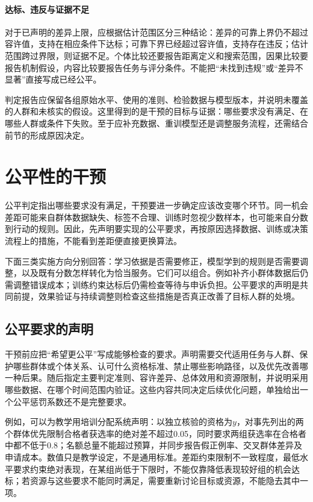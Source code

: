 \paragraph{达标、违反与证据不足}

对于已声明的差异上限，应根据估计范围区分三种结论：差异的可靠上界仍不超过容许值，支持在相应条件下达标；可靠下界已经超过容许值，支持存在违反；估计范围跨过界限，则证据不足。个体比较还要报告距离定义和搜索范围，因果比较要报告机制假设，内容比较要报告任务与评分条件。不能把“未找到违规”或“差异不显著”直接写成已经公平。

判定报告应保留各组原始水平、使用的准则、检验数据与模型版本，并说明未覆盖的人群和未核实的假设。这里得到的是干预的目标与证据：哪些要求没有满足、在哪些人群或条件下失败。至于应补充数据、重训模型还是调整服务流程，还需结合前节的形成原因决定。

\section{公平性的干预}
\label{sec:fairness-intervention}

公平判定指出哪些要求没有满足，干预要进一步确定应该改变哪个环节。同一机会差距可能来自群体数据缺失、标签不合理、训练时忽视少数样本，也可能来自分数到行动的规则。因此，先声明要实现的公平要求，再按原因选择数据、训练或决策流程上的措施，不能看到差距便直接更换算法。

下面三类实施方向分别回答：学习依据是否需要修正，模型学到的规则是否需要调整，以及既有分数怎样转化为恰当服务。它们可以组合。例如补齐小群体数据后仍需调整错误成本；训练约束达标后仍需检查等待与申诉负担。公平要求的声明是共同前提，效果验证与持续调整则检查这些措施是否真正改善了目标人群的处境。

\subsection{公平要求的声明}
\label{sec:fairness-requirements}

干预前应把“希望更公平”写成能够检查的要求。声明需要交代适用任务与人群、保护哪些群体或个体关系、认可什么资格标准、禁止哪些影响路径，以及优先改善哪一种后果。随后指定主要判定准则、容许差异、总体效用和资源限制，并说明采用哪些数据、在哪个时间范围内验证。这些内容共同决定后续优化问题，单独给出一个公平惩罚系数还不是完整要求。

例如，可以为教学用培训分配系统声明：以独立核验的资格为$y$，对事先列出的两个群体优先限制合格者获选率的绝对差不超过0.05，同时要求两组获选率在合格者中都不低于0.8；名额总量不能超过预算，并同步报告假正例率、交叉群体差异及申请成本。数值只是教学设定，不是通用标准。差距约束限制不一致程度，最低水平要求约束绝对表现，在某组尚低于下限时，不能仅靠降低表现较好组的机会达标；若资源与这些要求不能同时满足，需要重新讨论目标或资源，不能隐去其中一项。

